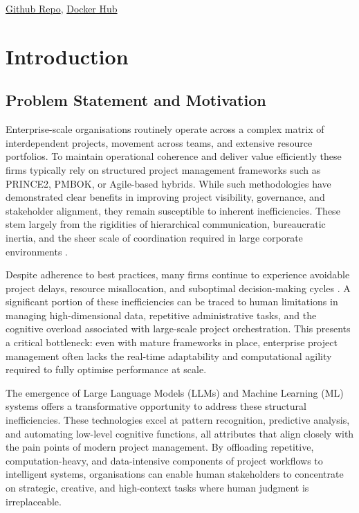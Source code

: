 \documentclass{report}
\begin{document}
\href{https://github.com/KnightNight101/UoR_APP/tree/main}{Github Repo},
\href{https://hub.docker.com/repository/docker/nightknight101/uor_app_nithings/general}{Docker Hub}

\tableofcontents

\newpage

\chapter{Introduction}  %
\section{Problem Statement and Motivation}

Enterprise-scale organisations routinely operate across a complex matrix of interdependent projects, movement across teams, and extensive resource portfolios.
To maintain operational coherence and deliver value efficiently these firms typically rely on structured project management frameworks such as PRINCE2, PMBOK, or Agile-based hybrids. 
While such methodologies have demonstrated clear benefits in improving project visibility, governance, and stakeholder alignment, they remain susceptible to inherent inefficiencies. 
These stem largely from the rigidities of hierarchical communication, bureaucratic inertia, and the sheer scale of coordination required in large corporate environments \parencite{pricaEnhancingProjectEfficiency2025}.

Despite adherence to best practices, many firms continue to experience avoidable project delays, resource misallocation, and suboptimal decision-making cycles \parencite{mankinsTurningGreatStrategy2005}. 
A significant portion of these inefficiencies can be traced to human limitations in managing high-dimensional data, repetitive administrative tasks, and the cognitive overload associated with large-scale project orchestration. 
This presents a critical bottleneck: even with mature frameworks in place, enterprise project management often lacks the real-time adaptability and computational agility required to fully optimise performance at scale.

The emergence of Large Language Models (LLMs) and Machine Learning (ML) systems offers a transformative opportunity to address these structural inefficiencies. 
These technologies excel at pattern recognition, predictive analysis, and automating low-level cognitive functions, all attributes that align closely with the pain points of modern project management. 
By offloading repetitive, computation-heavy, and data-intensive components of project workflows to intelligent systems, organisations can enable human stakeholders to concentrate on strategic, creative, and high-context tasks where human judgment is irreplaceable.
\end{document}
